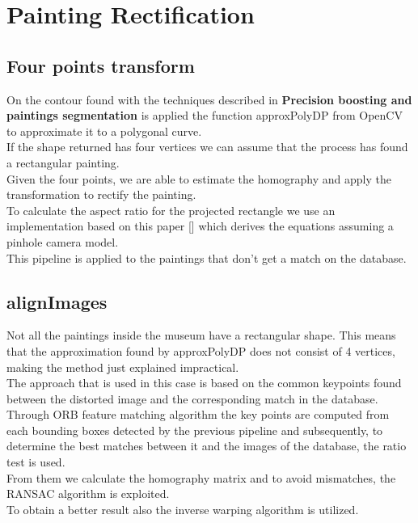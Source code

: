 \documentclass[conference]{IEEEtran}
\begin{document}
\section{Painting Rectification}
\subsection{Four points transform}
On the contour found with the techniques described in \textbf{Precision boosting and paintings segmentation} is applied the function approxPolyDP from OpenCV to approximate it to a polygonal curve.\\
If the shape returned has four vertices we can assume that the process has found a rectangular painting.\\
Given the four points, we are able to estimate the homography and apply the transformation to rectify the painting.\\
To calculate the aspect ratio for the projected rectangle we use an implementation based on this paper [] which derives the equations assuming a pinhole camera model.\\
This pipeline is applied to the paintings that don't get a match on the database.


\subsection{alignImages}
Not all the paintings inside the museum have a rectangular shape. This means that the approximation found by approxPolyDP does not consist of 4 vertices, making the method just explained impractical.\\
The approach that is used in this case is based on the common keypoints found between the distorted image and the corresponding match in the database.\\
Through ORB feature matching algorithm the key points are computed from each bounding boxes detected by the previous pipeline and subsequently, to determine the best matches between it and the images of the database, the ratio test is used.\\
From them we calculate the homography matrix and
to avoid mismatches, the RANSAC algorithm is exploited.\\
To obtain a better result also the inverse warping algorithm is utilized.
\end{document}
